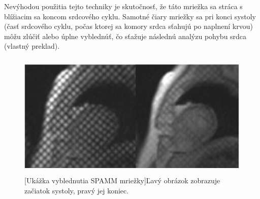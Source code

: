Nevýhodou použitia tejto techniky je skutočnosť, že táto mriežka sa stráca s blížiacim sa koncom srdcového cyklu. Samotné čiary mriežky sa pri konci systoly (časť srdcového cyklu, počas ktorej sa komory srdca sťahujú po naplnení krvou) môžu zlúčiť alebo úplne vyblednúť, čo sťažuje následnú analýzu pohybu srdca \cite{spamm_description} (vlastný preklad).

\begin {figure}[H]
        \centering
        \includegraphics[height=6cm]{media/heart/early_late_systole.png}
        \captionsetup{justification=centering}
        [Ukážka vyblednutia SPAMM mriežky]{Ľavý obrázok zobrazuje začiatok systoly, pravý jej koniec.}
\end {figure}

\clearpage